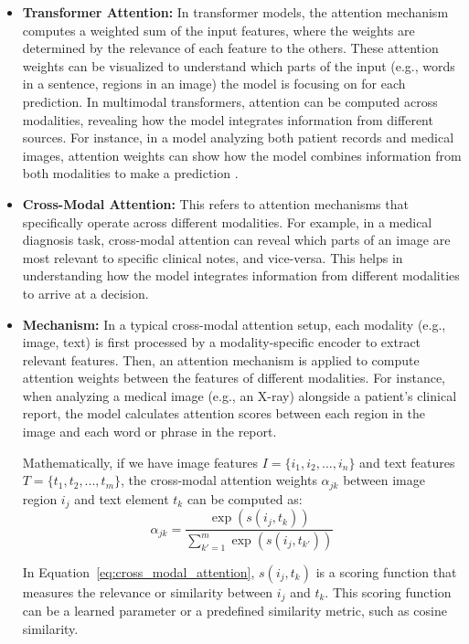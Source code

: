 \documentclass[pdflatex,sn-mathphys-num]{sn-jnl}%
\theoremstyle{thmstyleone}%
\theoremstyle{thmstyletwo}%
\theoremstyle{thmstylethree}%
\begin{document}
\begin{itemize}
\begin{itemize}
    \item \textbf{Transformer Attention:} In transformer models, the attention mechanism computes a weighted sum of the input features, where the weights are determined by the relevance of each feature to the others. These attention weights can be visualized to understand which parts of the input (e.g., words in a sentence, regions in an image) the model is focusing on for each prediction. In multimodal transformers, attention can be computed across modalities, revealing how the model integrates information from different sources. For instance, in a model analyzing both patient records and medical images, attention weights can show how the model combines information from both modalities to make a prediction \cite{vaswani2023attentionneed}.
    \item \textbf{Cross-Modal Attention:} This refers to attention mechanisms that specifically operate across different modalities. For example, in a medical diagnosis task, cross-modal attention can reveal which parts of an image are most relevant to specific clinical notes, and vice-versa. This helps in understanding how the model integrates information from different modalities to arrive at a decision.

    \item \textbf{Mechanism:}
    In a typical cross-modal attention setup, each modality (e.g., image, text) is first processed by a modality-specific encoder to extract relevant features. Then, an attention mechanism is applied to compute attention weights between the features of different modalities. For instance, when analyzing a medical image (e.g., an X-ray) alongside a patient's clinical report, the model calculates attention scores between each region in the image and each word or phrase in the report.

    Mathematically, if we have image features \( I = \{i_1, i_2, ..., i_n\} \) and text features \( T = \{t_1, t_2, ..., t_m\} \), the cross-modal attention weights \( \alpha_{jk} \) between image region \( i_j \) and text element \( t_k \) can be computed as:
\begin{equation}
     \alpha_{jk} = \frac{\exp(s(i_j, t_k))}{\sum_{k'=1}^{m} \exp(s(i_j, t_{k'}))} 
\label{eq:cross_modal_attention}
\end{equation}

    In Equation~\eqref{eq:cross_modal_attention}, \( s(i_j, t_k) \) is a scoring function that measures the relevance or similarity between \( i_j \) and \( t_k \). This scoring function can be a learned parameter or a predefined similarity metric, such as cosine similarity.


\end{itemize}
\end{itemize}
\end{document}
